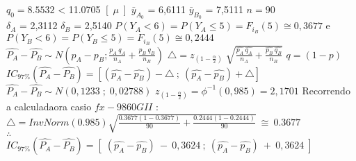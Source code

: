 \vspace{1cm}
\newline
$q_0=8.5532$ < 11.0705
\newline
\vspace{1cm}
\newline
$\left[ \; \mu \; \right]$
\newline
\vspace{1cm}
\newline
$\bar{y}_{A_0}$ = 6,6111 \qquad $\bar{y}_{B_0}$ = 7,5111 \qquad $n=90$ \\
$\delta_A$ = 2,3112 \qquad $\delta_B$ = 2,5140
\newline
\vspace{1cm}
\newline
$P(Y_A < 6)=P(Y_A \leqslant 5)=F_{i_B}(5) \cong 0,3677 $  \quad e \quad $P(Y_B < 6)=P(Y_B \leqslant 5)=F_{i_B}(5) \cong 0,2444$
\newline
\vspace{1cm}
\newline
$\hat{P_A}-\hat{P_B} \sim N \left( p_A - p_B ; \frac{p_A\:q_A}{n_A} + \frac{p_B\:q_B}{n_B}\right)$ \hspace{1cm}
$\triangle=z_{(1-\frac{\alpha}{2})} \;\sqrt{\frac{\hat{p_A} \: \hat{q_A}}{n_A}+\frac{\hat{p_B} \: \hat{q_B}}{n_B}}$ \hspace{1cm} $q=(1-p)$
\newline
\vspace{1cm}
\newline
$IC_{97\%}(\hat{P_A}-\hat{P_B})=\left[(\hat{p_A}-\hat{p_B})-\triangle \: ; \: (\hat{p_A}-\hat{p_B})+\triangle \right]$
\newline
\vspace{1cm}
\newline
$\hat{P_A}-\hat{P_B} \sim N \left( 0,1233 \; ; \; 0,02788\right)$ \hspace{1cm}
$z_{(1-\frac{\alpha}{2})}=\phi^{-1}(0,985)=2,1701$
\newline
\vspace{1cm}
\newline
Recorrendo a calculadaora casio $fx-9860GII$ :
\newline
\vspace{1cm}
\newline
$\triangle= InvNorm(0.985)\sqrt{\frac{0.3677(1-0.3677)}{90}+\frac{0.2444(1-0.2444)}{90}}\: \cong \:0.3677$
\\
$\therefore$
\\
$IC_{97\%}(\hat{P_A}-\hat{P_B})=\left[ \; (\hat{p_A}-\hat{p_B}) \:-\: 0,3624 \: ; \: (\hat{p_A}-\hat{p_B}) \:+\: 0,3624 \; \right]$
